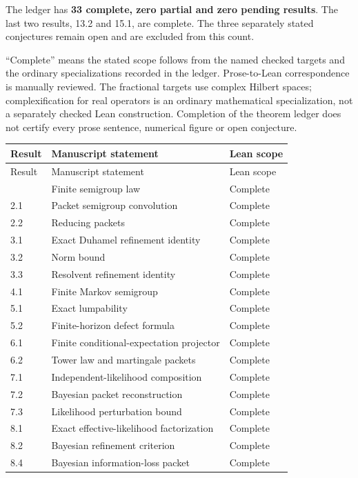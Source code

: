 \documentclass[11pt,letterpaper]{article}
\theoremstyle{plain}
\theoremstyle{plain}
\theoremstyle{plain}
\theoremstyle{definition}
\theoremstyle{definition}
\theoremstyle{definition}
\theoremstyle{definition}
\theoremstyle{definition}
\theoremstyle{remark}
\theoremstyle{remark}
\theoremstyle{remark}
\theoremstyle{remark}
\theoremstyle{remark}
\theoremstyle{remark}
\begin{document}
The ledger has \textbf{33 complete, zero partial and zero pending results}.
The last two results, 13.2 and 15.1, are complete. The three separately stated
conjectures remain open and are excluded from this count.

``Complete'' means the stated scope follows from the named checked targets
and the ordinary specializations recorded in the ledger. Prose-to-Lean correspondence
is manually reviewed. The fractional targets use complex Hilbert spaces;
complexification for real operators is an ordinary mathematical specialization,
not a separately checked Lean construction. Completion of the theorem ledger does
not certify every prose sentence, numerical figure or open conjecture.

\small
\begin{longtable}{@{}p{}p{}p{}@{}}
\toprule Result & Manuscript statement & Lean scope\\
\midrule\endfirsthead
\toprule Result & Manuscript statement & Lean scope\\\midrule\endhead
\bottomrule\endfoot
1.2 & Finite semigroup law & Complete\\
2.1 & Packet semigroup convolution & Complete\\
2.2 & Reducing packets & Complete\\
3.1 & Exact Duhamel refinement identity & Complete\\
3.2 & Norm bound & Complete\\
3.3 & Resolvent refinement identity & Complete\\
4.1 & Finite Markov semigroup & Complete\\
5.1 & Exact lumpability & Complete\\
5.2 & Finite-horizon defect formula & Complete\\
6.1 & Finite conditional-expectation projector & Complete\\
6.2 & Tower law and martingale packets & Complete\\
7.1 & Independent-likelihood composition & Complete\\
7.2 & Bayesian packet reconstruction & Complete\\
7.3 & Likelihood perturbation bound & Complete\\
8.1 & Exact effective-likelihood factorization & Complete\\
8.2 & Bayesian refinement criterion & Complete\\
8.4 & Bayesian information-loss packet & Complete\\

\end{longtable}
\end{document}
